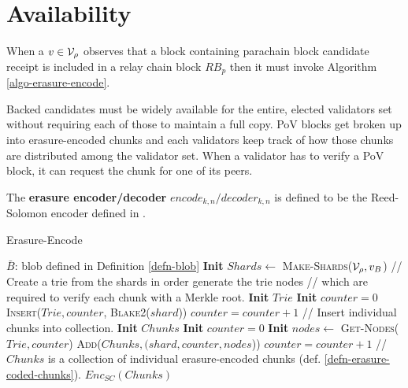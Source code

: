 \section{Availability}

When a $v \in \mathcal{V}_\rho$ observes that a block containing parachain block
candidate receipt is included in a relay chain block $RB_p$ then it must invoke
Algorithm \ref{algo-erasure-encode}.
\newline

Backed candidates must be widely available for the entire, elected validators
set without requiring each of those to maintain a full copy. PoV blocks get
broken up into erasure-encoded chunks and each validators keep track of how
those chunks are distributed among the validator set. When a validator has to
verify a PoV block, it can request the chunk for one of its peers.

\begin{definition}
  \label{defn-erasure-encoder-decoder}
  The {\bf erasure encoder/decoder} {\bf $encode_{k,n}/decoder_{k,n}$ } is
  defined to be the Reed-Solomon encoder defined in \cite{??}.
\end{definition}

\begin{algorithm}[H]
  \caption[]{\sc Erasure-Encode}
  \label{algo-erasure-encode}
  \begin{algorithmic}[1]
    \Require
    $\bar{B}$: blob defined in Definition \ref{defn-blob}
    \State \textbf{Init} $Shards \leftarrow$ \textsc{Make-Shards}($\mathcal{V}_\rho, v_B$)
    \Statex
    \Statex // Create a trie from the shards in order generate the trie nodes
    \Statex // which are required to verify each chunk with a Merkle root.
    \State \textbf{Init} $Trie$
    \State \textbf{Init} $counter = 0$
      \State \textsc{Insert}($Trie,counter$, \textsc{Blake2}($shard$))
      \State $counter = counter + 1$
    \EndFor
    \Statex
    \Statex // Insert individual chunks into collection.
    \State \textbf{Init} $Chunks$
    \State \textbf{Init} $counter = 0$
      \State \textbf{Init} $nodes \leftarrow$ \textsc{Get-Nodes}($Trie, counter$)
      \State \textsc{Add}($Chunks, (shard, counter, nodes$))
      \State $counter = counter + 1$
    \EndFor
    \Statex
    \Statex // $Chunks$ is a collection of individual erasure-encoded chunks (def. \ref{defn-erasure-coded-chunks}).
    \State \Return $Enc_{SC}(Chunks)$
  \end{algorithmic}
\end{algorithm}

